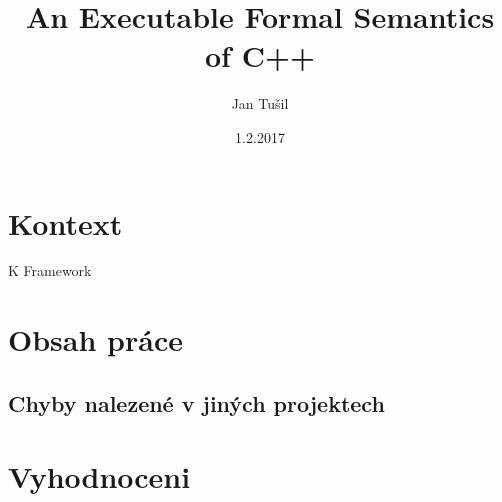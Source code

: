 \documentclass[11pt]{beamer}
\author{Jan Tušil}
\title{An Executable Formal Semantics of C++}
\institute{FI MU}
\date{1.2.2017}
\begin{document}




\begin{frame}
\titlepage
\end{frame}

% 
\begin{frame}
\tableofcontents
\end{frame}

\section{Kontext}

\begin{frame}{K Framework}

\end{frame}

\section{Obsah práce}

\subsection{Chyby nalezené v jiných projektech}


\section{Vyhodnoceni}

\end{document}
